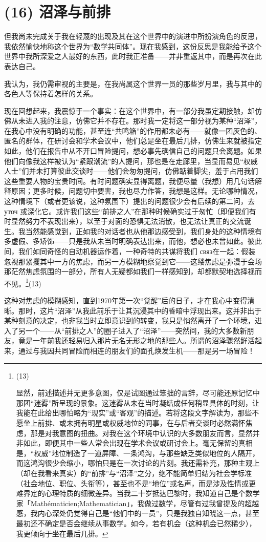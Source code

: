 \section{(16) 沼泽与前排}

但我尚未完成关于我在轻蔑的出现及其在这个世界中的演进中所扮演角色的反思，我依然愉快地称这个世界为“数学共同体”。现在我感到，这份反思是我能给予这个世界中我所深爱之人最好的东西，此时我正准备——并非重返其中，而是再次在此表达自己。

我认为，我仍需审视的主要是，在我尚属这个世界一员的那些岁月里，我与其中的各色人等保持着怎样的关系。

现在回想起来，我震惊于一个事实：在这个世界中，有一部分我虽定期接触，却仿佛从未进入我的注意，仿佛它并不存在。那时我一定将这一部分视为某种“沼泽”，在我心中没有明确的功能，甚至连“共鸣箱”的作用都未必有——就像一团灰色的、匿名的群体，在研讨会和学术会议中，他们总是坐在最后几排，仿佛生来就被指定如此，他们在报告中从不开口冒险提问，想必事先确信自己的问题只会离题。如果他们向像我这样被认为“紧跟潮流”的人提问，那也是在走廊里，当显而易见“权威人士”们并未打算彼此交谈时——他们会匆匆提问，仿佛踮着脚尖，羞于占用我们这些重要人物的宝贵时间。有时问题确实显得离题，我便尽量（我想）用几句话解释原因；更多时候，问题切中要害，我也尽力作答，我想是这样。无论哪种情况，这种情境下（或者更该说，这种氛围下）提出的问题很少会有后续的第二问，去 уточ 或深化它。或许我们这些“前排之人”在那种时候确实过于匆忙（即便我们有时显然努力不表现出来），以至于对面的恐惧无法消散，也无法让真正的交流诞生。我当然能感觉到，正如我的对话者也从他那边感受到，我们身处的这种情境有多虚假、多矫饰——只是我从未当时明确表达出来，而他，想必也未曾如此。彼此间，我们如同奇怪的自动机器运作着，一种奇特的共谋将我们 связ在一起：假装忽视那紧攫其中一方的焦虑，而另一方模糊地察觉到它——这缕焦虑是弥漫于会场那茫然焦虑氛围的一部分，所有人无疑都如我们一样感知到，却都默契地选择视而不见。\footnote{(13)\par 显然，前述描述并无更多意图，仅是试图通过笨拙的言辞，尽可能还原记忆中那团“迷雾”所呈现的景象。这迷雾从未在当时凝结成任何稍显具体的时刻，让我能在此给出哪怕略为“现实”或“客观”的描述。若将这段文字解读为，那些不愿坐上前排、或未拥有明星或权威地位的同事，在与后者交谈时必然满怀焦虑，那是对我意图的扭曲。对我在这个环境中认识的大多数朋友而言，显然并非如此，即便其中一些人常会出现在学术会议或研讨会上。毫无保留的真相是，“权威”地位制造了一道屏障、一条鸿沟，与那些缺乏类似地位的人隔开，而这鸿沟很少会缩小，哪怕只是在一次讨论的片刻。我还需补充，那种主观上（却在我看来真实）的“前排”与“沼泽”之分，绝不能简单归结为社会学标准（社会地位、职位、头衔等），甚至也不是“地位”或名声，而是涉及性情或更难界定的心理特质的细微差异。当我二十岁抵达巴黎时，我知道自己是个数学家「Mathématicien;Mathematician」，我做过数学，尽管有过我曾提及的超越感，我内心深处仍觉得自己是“他们中的一员”，只是我独自知晓这一点，甚至最初还不确定是否会继续从事数学。如今，若有机会（这种机会已然稀少），我更倾向于坐在最后几排。}(13)

这种对焦虑的模糊感知，直到1970年第一次“觉醒”后的日子，才在我心中变得清晰。那时，这片“沼泽”从我此前乐于让其沉浸其中的昏暗中浮现出来。这并非出于某种刻意的决定，也非我当时立即意识到的转变，我只是悄然离开了一个环境，进入了另一个——从“前排之人”的圈子进入了“沼泽”——突然间，我的大多数新朋友，竟是一年前我还轻易归入那片无名无形之地的那些人。所谓的沼泽骤然鲜活起来，通过与我因共同冒险而相连的朋友们的面孔焕发生机——那是另一场冒险！